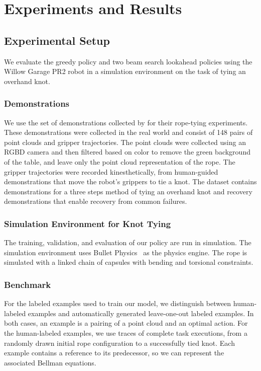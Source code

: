 \section{Experiments and Results}
\label{sec:experiments}

\subsection{Experimental Setup}
We evaluate the greedy policy and two beam search lookahead policies using the Willow Garage PR2 robot in a simulation environment on the task of tying an overhand knot.

\subsubsection{Demonstrations}
We use the set of demonstrations collected by \citet{Schulmanetal_ISRR2013} for their rope-tying experiments.
These demonstrations were collected in the real world and consist of 148 pairs of point clouds and gripper trajectories.
The point clouds were collected using an RGBD camera and then filtered based on color to remove the green background of the table, and leave only the point cloud representation of the rope.
The gripper trajectories were recorded kinesthetically, from human-guided demonstrations that move the robot's grippers to tie a knot.
The dataset contains demonstrations for a three steps method of tying an overhand knot and recovery demonstrations that
enable recovery from common failures.

\subsubsection{Simulation Environment for Knot Tying} 
The training, validation, and evaluation of our policy are run in simulation.
The simulation environment uses Bullet Physics~\cite{Bullet_Physics} as the physics engine.
The rope is simulated with a linked chain of capsules with bending and torsional constraints.

\subsubsection{Benchmark}
For the labeled examples  used to train our \mmql{} model, we distinguish between human-labeled examples 
and automatically generated leave-one-out labeled examples.
In both cases, an example is a pairing of a point cloud and an optimal action.
For the human-labeled examples, we use traces of complete task executions, from a randomly drawn initial 
rope configuration to a successfully tied knot.
Each example contains a reference to its predecessor, so we can represent the associated Bellman equations.

